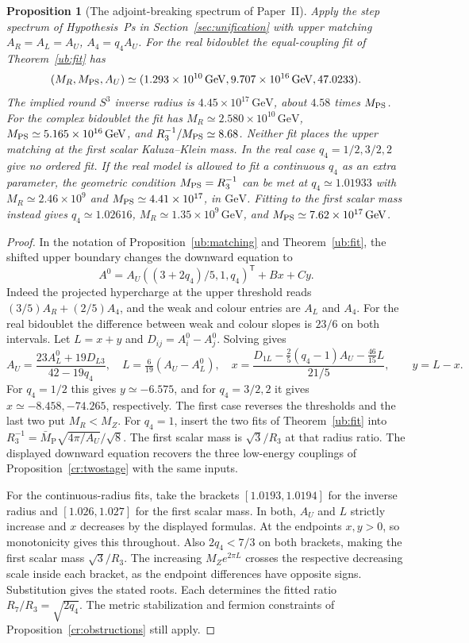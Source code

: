 \documentclass[aps,pra,onecolumn,superscriptaddress,nofootinbib,10pt]{revtex4-2}
\newtheorem{proposition}[theorem]{Proposition}
\theoremstyle{definition}
\theoremstyle{remark}
\begin{document}
\begin{proposition}[The adjoint-breaking spectrum of Paper~II]\label{cr:paperspectrum}
Apply the step spectrum of Hypothesis~Ps in
Section~\ref{sec:unification} with upper matching
$A_R=A_L=A_U$, $A_4=q_4A_U$. For the real bidoublet the
equal-coupling fit of Theorem~\ref{ub:fit} has
\[
 (M_R,M_{\rm PS},A_U)\simeq
 (1.293\times10^{10}\,\mathrm{GeV},
  9.707\times10^{16}\,\mathrm{GeV},47.0233).
\]
The implied round $S^3$ inverse radius is
$4.45\times10^{17}\,\mathrm{GeV}$, about $4.58$ times $M_{\rm PS}$.
For the complex bidoublet the fit has
$M_R\simeq2.580\times10^{10}\,\mathrm{GeV}$,
$M_{\rm PS}\simeq5.165\times10^{16}\,\mathrm{GeV}$,
and $R_3^{-1}/M_{\rm PS}\simeq8.68$. Neither fit places the
upper matching at the first scalar Kaluza--Klein mass.
In the real case $q_4=1/2,3/2,2$ give no ordered fit.
If the real model is allowed to fit a continuous $q_4$ as an
extra parameter, the geometric condition $M_{\rm PS}=R_3^{-1}$
can be met at $q_4\simeq1.01933$ with $M_R\simeq2.46\times10^9$
and $M_{\rm PS}\simeq4.41\times10^{17}$, in $\mathrm{GeV}$.
Fitting to the first scalar mass instead gives $q_4\simeq1.02616$,
$M_R\simeq1.35\times10^9\,\mathrm{GeV}$, and
$M_{\rm PS}\simeq7.62\times10^{17}\,\mathrm{GeV}$.
\end{proposition}
\begin{proof}
In the notation of Proposition~\ref{ub:matching} and
Theorem~\ref{ub:fit}, the shifted upper boundary changes the
downward equation to
\[
 A^0=A_U((3+2q_4)/5,1,q_4)^{\mathsf T}+Bx+Cy .
\]
Indeed the projected hypercharge at the upper threshold reads
$(3/5)A_R+(2/5)A_4$, and the weak and colour entries are
$A_L$ and $A_4$. For the real bidoublet the difference between
weak and colour slopes is $23/6$ on both intervals.
Let $L=x+y$ and $D_{ij}=A_i^0-A_j^0$. Solving gives
\[
 A_U=\frac{23 A_L^0+19D_{L3}}{42-19q_4},
 \quad L=\tfrac6{19}(A_U-A_L^0),
 \quad x=\frac{D_{1L}-\tfrac25(q_4-1)A_U-\tfrac{46}{15}L}
                  {21/5}, \qquad y=L-x.
\]
For $q_4=1/2$ this gives $y\simeq-6.575$, and for $q_4=3/2,2$
it gives $x\simeq-8.458,-74.265$, respectively. The first
case reverses the thresholds and the last two put $M_R<M_Z$.
For $q_4=1$, insert the two fits of Theorem~\ref{ub:fit}
into $R_3^{-1}=\bar M_{\mathrm P}\sqrt{4\pi/A_U}/\sqrt8$.
The first scalar mass is $\sqrt3/R_3$ at that radius ratio.
The displayed downward equation recovers the three low-energy
couplings of Proposition~\ref{cr:twostage} with the same inputs.

For the continuous-radius fits, take the brackets
$[1.0193,1.0194]$ for the inverse radius and $[1.026,1.027]$
for the first scalar mass. In both, $A_U$ and $L$ strictly
increase and $x$ decreases by the displayed formulas.
At the endpoints $x,y>0$, so monotonicity gives this throughout.
Also $2q_4<7/3$ on both brackets, making the first scalar
mass $\sqrt3/R_3$. The increasing $M_Z e^{2\pi L}$ crosses
the respective decreasing scale inside each bracket, as the
endpoint differences have opposite signs. Substitution gives
the stated roots. Each determines the fitted ratio
$R_7/R_3=\sqrt{2q_4}$. The metric stabilization and fermion
constraints of Proposition~\ref{cr:obstructions} still apply.
\end{proof}
\end{document}
